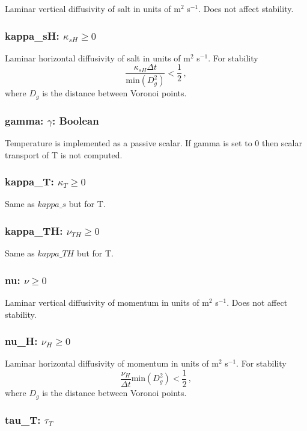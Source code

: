 \documentclass[12pt,oneside]{article}
\begin{document}
Laminar vertical diffusivity of salt in units of m$^2$ s$^{-1}$.  Does not affect stability.

\subsubsection{kappa\_sH: $\kappa_{sH}\ge 0$}

Laminar horizontal diffusivity of salt in units of m$^2$ s$^{-1}$.  For stability 
\[
\frac{\kappa_{sH}\Delta t}{\mbox{min}(D_g^2)}<\frac{1}{2}\,,
\]
where $D_g$ is the distance between Voronoi points.  

\subsubsection{gamma: $\gamma$: Boolean}

Temperature is implemented as a passive scalar.  If gamma is set to 0 then scalar
transport of T is not computed.

\subsubsection{kappa\_T: $\kappa_T\ge 0$}

Same as $kappa\_s$ but for T.

\subsubsection{kappa\_TH: $\nu_{TH}\ge 0$}

Same as $kappa\_TH$ but for T.

\subsubsection{nu: $\nu\ge 0$}

Laminar vertical diffusivity of momentum in units of m$^2$ s$^{-1}$.  Does not affect stability.

\subsubsection{nu\_H: $\nu_{H}\ge 0$}

Laminar horizontal diffusivity of momentum in units of m$^2$ s$^{-1}$.  For stability 
\[
\frac{\nu_{H}}{\Delta t}{\mbox{min}(D_g^2)}<\frac{1}{2}\,,
\]
where $D_g$ is the distance between Voronoi points.  

\subsubsection{tau\_T: $\tau_T$}
\end{document}
